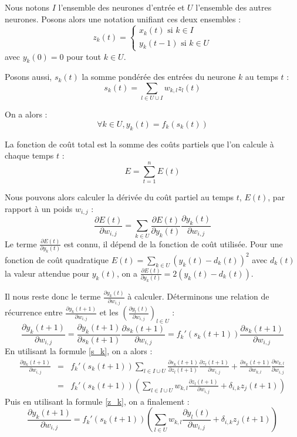 Nous notons $I$ l'ensemble des neurones d'entrée et $U$ l'ensemble des autres neurones. Posons alors une notation unifiant ces deux ensembles : 
\begin{equation}
z_k(t) = \left\{
    \begin{array}{ll}
        x_k(t) \text{ si } k \in I \\
        y_k(t-1) \text{ si } k \in U
    \end{array}
\right.
\label{z_k}
\end{equation}
avec $y_k(0) = 0$ pour tout $k \in U$.

Posons aussi, $s_k(t)$ la somme pondérée des entrées du neurone $k$ au temps $t$ :
\begin{equation}
s_k(t) = \sum_{l \in U \cup I}{w_{k,l}z_l(t)}
\label{s_k}
\end{equation}

On a alors :
$$
\forall k \in U, y_k(t) = f_k(s_k(t))
$$

La fonction de coût total est la somme des coûts partiels que l'on calcule à chaque temps $t$ :
$$
E = \sum_{t=1}^{n}{E(t)}
$$

Nous pouvons alors calculer la dérivée du coût partiel au temps $t$, $E(t)$, par rapport à un poids $w_{i,j}$ :
\begin{equation}
\frac{\partial E(t)}{\partial w_{i,j}} = \sum_{k \in U}{\frac{\partial E(t)}{\partial y_k(t)}\frac{\partial y_k(t)}{\partial w_{i,j}}}
\label{E_t}
\end{equation}
Le terme $\frac{\partial E(t)}{\partial y_k(t)}$ est connu, il dépend de la fonction de coût utilisée. Pour une fonction de coût quadratique $E(t) = \sum_{k \in U}{(y_k(t) - d_k(t))^2}$ avec $d_k(t)$ la valeur attendue pour $y_k(t)$, on a $\frac{\partial E(t)}{\partial y_k(t)} = 2(y_k(t) - d_k(t))$. 

Il nous reste donc le terme $\frac{\partial y_k(t)}{\partial w_{i,j}}$ à calculer. Déterminons une relation de récurrence entre $\frac{\partial y_k(t+1)}{\partial w_{i,j}}$ et les $(\frac{\partial y_l(t)}{\partial w_{i,j}})_{l\in U}$ :
$$
\frac{\partial y_k(t+1)}{\partial w_{i,j}} 
= \frac{\partial y_k(t+1)}{\partial s_k(t+1)}\frac{\partial s_k(t+1)}{\partial w_{i,j}}
= f_k'(s_k(t+1))\frac{\partial s_k(t+1)}{\partial w_{i,j}}
$$
En utilisant la formule \ref{s_k}, on a alors :
$$
\begin{array}{rcl}
\frac{\partial y_k(t+1)}{\partial w_{i,j}} & 
= & f_k'(s_k(t+1))\sum_{l \in I \cup U}{\frac{\partial s_k(t+1)}{\partial z_l(t+1)}\frac{\partial z_l(t+1)}{\partial w_{i,j}}+\frac{\partial s_k(t+1)}{\partial w_{k,l}}\frac{\partial w_{k,l}}{\partial w_{i,j}}} \\
& = & f_k'(s_k(t+1))\left(\sum_{l \in I \cup U}{w_{k,l}\frac{\partial z_l(t+1)}{\partial w_{i,j}}}+\delta_{i,k}z_j(t+1)\right)
\end{array}
$$
Puis en utilisant la formule \ref{z_k}, on a finalement :
\begin{equation}
\frac{\partial y_k(t+1)}{\partial w_{i,j}} = f_k'(s_k(t+1))\left(\sum_{l \in U}{w_{k,l}\frac{\partial y_l(t)}{\partial w_{i,j}}}+\delta_{i,k}z_j(t+1)\right)
\label{y_k_recurrence}
\end{equation}

